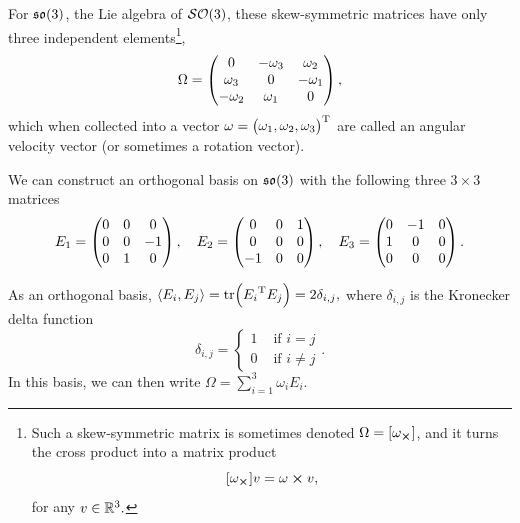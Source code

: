 \documentclass[../../main.tex]{subfiles}
\begin{document}
\begin{refsection}
	\begin{corollary}
		For $\mathfrak{so} (3)$, the Lie algebra of $\mathcal{SO} (3)$, these skew-symmetric matrices have only three independent elements\footnote{
		Such a skew-symmetric matrix is sometimes denoted $\Omega = [\omega_{\cross}]$, and it turns the cross product into a matrix product
		$$[\omega_{\cross}] v = \omega \cross v,$$
		for any $v \in \mathbb{R}^3.$
		},
		$$\mat{\Omega} = \begin{pmatrix}
				0         & -\omega_3 & \omega_2  \\
				\omega_3  & 0         & -\omega_1 \\
				-\omega_2 & \omega_1  & 0         \\
			\end{pmatrix},$$
		which when collected into a vector $\omega = {\begin{pmatrix} \omega_1, \omega_2, \omega_3 \end{pmatrix}}^\mathrm{T}$ are called an angular velocity vector (or sometimes a rotation vector).
	\end{corollary}

	We can construct an orthogonal basis on $\mathfrak{so} (3)$ with the following three $3 \times 3$ matrices
	$$
		\mat{E}_1 = \begin{pmatrix}
			0 & 0 & 0  \\
			0 & 0 & -1 \\
			0 & 1 & 0  \\
		\end{pmatrix}, \quad
		\mat{E}_2 = \begin{pmatrix}
			0  & 0 & 1 \\
			0  & 0 & 0 \\
			-1 & 0 & 0 \\
		\end{pmatrix}, \quad
		\mat{E}_3 = \begin{pmatrix}
			0 & -1 & 0 \\
			1 & 0  & 0 \\
			0 & 0  & 0 \\
		\end{pmatrix}.
	$$

	As an orthogonal basis, $\left\langle E_i, E_j \right\rangle = \tr({E_i}^\mathrm{T} E_j) = 2\delta_{i,j},$ where $\delta_{i,j}$ is the Kronecker delta function
	$$
		\delta_{i,j} = \begin{cases}
			1 & \text{ if } i = j   \\
			0 & \text{ if } i \ne j
		\end{cases}.
	$$
	In this basis, we can then write $\Omega = \sum_{i=1}^3 \omega_i E_i$.


\end{refsection}
\end{document}
